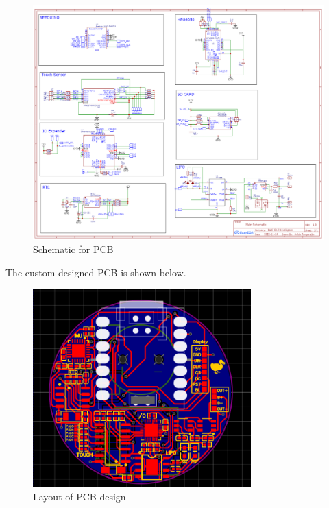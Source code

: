 \documentclass[12pt, titlepage]{article}
\begin{document}
\begin{figure}[H]
	\begin{center}
		 \includegraphics[width=1\textwidth]{Schematic}
		\caption{Schematic for PCB}
		\label{Schematic} 
	\end{center}
\end{figure}

The custom designed PCB is shown below.

\begin{figure}[H]
	\begin{center}
		 \includegraphics[width=0.75\textwidth]{Layout}
		\caption{Layout of PCB design}
		\label{Layout} 
	\end{center}
\end{figure}
\end{document}
